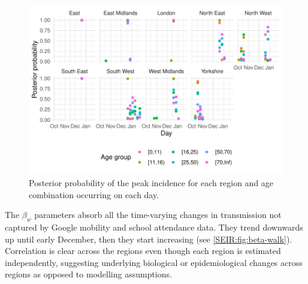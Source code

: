 \documentclass[thesis.tex]{subfiles}
\begin{document}
\begin{figure}
    \includegraphics{SEIR/CIS/p_peak}
    \caption[Posterior estimates of peak incidence timing]{%
        Posterior probability of the peak incidence for each region and age combination occurring on each day.
    }
    \label{SEIR:fig:peak-incidence}
\end{figure}

The $\beta_w$ parameters absorb all the time-varying changes in transmission not captured by Google mobility and school attendance data.
They trend downwards up until early December, then they start increasing (see \cref{SEIR:fig:beta-walk}).
Correlation is clear across the regions even though each region is estimated independently, suggesting underlying biological or epidemiological changes across regions as opposed to modelling assumptions.
\end{document}
